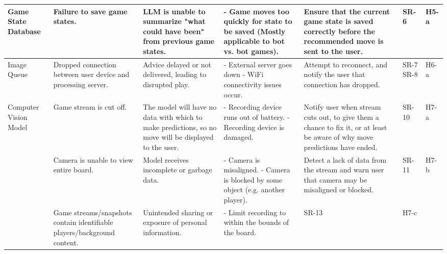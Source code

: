 \documentclass{article}
\begin{document}
\begin{landscape}
\begin{tabularx}{\linewidth}{|P{2.5cm}|Y|Y|Y|Y|P{1cm}|P{1cm}|}
        \hline

        Game State Database &
        Failure to save game states. &
        LLM is unable to summarize "what could have been" from previous game states. &
        - Game moves too quickly for state to be saved (Mostly applicable to bot vs. bot games). &
        Ensure that the current game state is saved correctly before the recommended move is sent to the user. &
        SR-6 &
        H5-a \\

        \hline

        Image Queue &
        Dropped connection between user device and processing server. &
        Advice delayed or not delivered, leading to disrupted play. &
        - External server goes down \newline - WiFi connectivity issues occur. &
        Attempt to reconnect, and notify the user that connection has dropped. &
        SR-7 \newline SR-8 &
        H6-a \\

        \hline

        Computer Vision Model &
        Game stream is cut off. &
        The model will have no data with which to make predictions, so no move will be displayed to the user. &
        - Recording device runs out of battery. \newline - Recording device is damaged. &
        Notify user when stream cuts out, to give them a chance to fix it, or at least be aware of why move predictions have ended. &
        SR-10 &
        H7-a \\

        &
        Camera is unable to view entire board. &
        Model receives incomplete or garbage data. &
        - Camera is misaligned. \newline - Camera is blocked by some object (e.g. another player). &
        Detect a lack of data from the stream and warn user that camera may be misaligned or blocked. &
        SR-11 &
        H7-b \\

        &
        Game streams/snapshots contain identifiable players/background content.
        &
        Unintended sharing or exposure of personal information. &
        - Limit recording to within the bounds of the board. &
        SR-13 &
        H7-c \\
        
        \hline


\end{tabularx}
\end{landscape}
\end{document}
